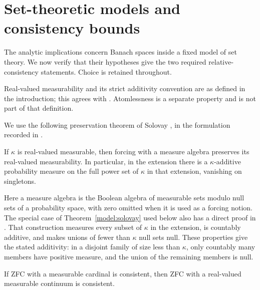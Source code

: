\section{Set-theoretic models and consistency bounds}\label{model:section}

The analytic implications concern Banach spaces inside a fixed model of
set theory.  We now verify that their hypotheses give the two required
relative-consistency statements.  Choice is retained throughout.

Real-valued measurability and its strict additivity convention are as defined
in the introduction; this agrees with \cite[Definition~1.1]{Caicedo2006}.
Atomlessness is a separate property and is not part of that definition.

We use the following preservation theorem of Solovay
\cite[Theorem~7]{Solovay1971}, in the formulation recorded in
\cite[Fact~1.27]{Caicedo2006}.

\begin{theorem}[Solovay]\label{model:solovay}
If $\kappa$ is real-valued measurable, then forcing with a measure algebra
preserves its real-valued measurability.  In particular, in the extension
there is a $\kappa$-additive probability measure on the full power set of
$\kappa$ in that extension, vanishing on singletons.
\end{theorem}

Here a measure algebra is the Boolean algebra of measurable sets modulo
null sets of a probability space, with zero omitted when it is used as a
forcing notion.  The special case of Theorem~\ref{model:solovay} used
below also has a direct proof in
\cite[Section~2, Lemmas~2.1--2.4]{FuchinoGreenbergShelah2006}.
That construction measures every subset of $\kappa$ in the extension,
is countably additive, and makes unions of fewer than $\kappa$ null sets
null. These properties give the stated additivity: in a disjoint family
of size less than $\kappa$, only countably many members have positive
measure, and the union of the remaining members is null.

\begin{proposition}\label{model:positive}
If ZFC with a measurable cardinal is consistent, then ZFC with a
real-valued measurable continuum is consistent.
\end{proposition}

